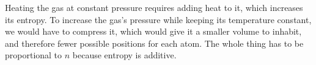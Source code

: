 Heating the gas at constant pressure requires
adding heat to it, which increases its entropy. To increase the gas's pressure
while keeping its temperature constant, we would have to compress it,
which would give it a smaller volume to inhabit, and therefore fewer possible
positions for each atom. The whole thing has to be proportional to $n$ because
entropy is additive.
